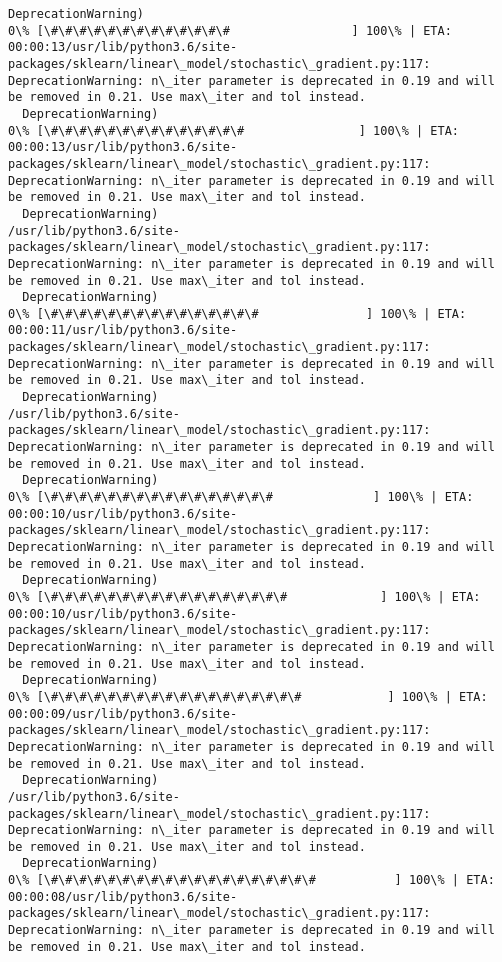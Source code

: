 \documentclass[11pt]{article}
\begin{document}
\begin{Verbatim}[commandchars=\\\{\}]
  DeprecationWarning)
0\% [\#\#\#\#\#\#\#\#\#\#\#\#\#                 ] 100\% | ETA: 00:00:13/usr/lib/python3.6/site-packages/sklearn/linear\_model/stochastic\_gradient.py:117: DeprecationWarning: n\_iter parameter is deprecated in 0.19 and will be removed in 0.21. Use max\_iter and tol instead.
  DeprecationWarning)
0\% [\#\#\#\#\#\#\#\#\#\#\#\#\#\#                ] 100\% | ETA: 00:00:13/usr/lib/python3.6/site-packages/sklearn/linear\_model/stochastic\_gradient.py:117: DeprecationWarning: n\_iter parameter is deprecated in 0.19 and will be removed in 0.21. Use max\_iter and tol instead.
  DeprecationWarning)
/usr/lib/python3.6/site-packages/sklearn/linear\_model/stochastic\_gradient.py:117: DeprecationWarning: n\_iter parameter is deprecated in 0.19 and will be removed in 0.21. Use max\_iter and tol instead.
  DeprecationWarning)
0\% [\#\#\#\#\#\#\#\#\#\#\#\#\#\#\#               ] 100\% | ETA: 00:00:11/usr/lib/python3.6/site-packages/sklearn/linear\_model/stochastic\_gradient.py:117: DeprecationWarning: n\_iter parameter is deprecated in 0.19 and will be removed in 0.21. Use max\_iter and tol instead.
  DeprecationWarning)
/usr/lib/python3.6/site-packages/sklearn/linear\_model/stochastic\_gradient.py:117: DeprecationWarning: n\_iter parameter is deprecated in 0.19 and will be removed in 0.21. Use max\_iter and tol instead.
  DeprecationWarning)
0\% [\#\#\#\#\#\#\#\#\#\#\#\#\#\#\#\#              ] 100\% | ETA: 00:00:10/usr/lib/python3.6/site-packages/sklearn/linear\_model/stochastic\_gradient.py:117: DeprecationWarning: n\_iter parameter is deprecated in 0.19 and will be removed in 0.21. Use max\_iter and tol instead.
  DeprecationWarning)
0\% [\#\#\#\#\#\#\#\#\#\#\#\#\#\#\#\#\#             ] 100\% | ETA: 00:00:10/usr/lib/python3.6/site-packages/sklearn/linear\_model/stochastic\_gradient.py:117: DeprecationWarning: n\_iter parameter is deprecated in 0.19 and will be removed in 0.21. Use max\_iter and tol instead.
  DeprecationWarning)
0\% [\#\#\#\#\#\#\#\#\#\#\#\#\#\#\#\#\#\#            ] 100\% | ETA: 00:00:09/usr/lib/python3.6/site-packages/sklearn/linear\_model/stochastic\_gradient.py:117: DeprecationWarning: n\_iter parameter is deprecated in 0.19 and will be removed in 0.21. Use max\_iter and tol instead.
  DeprecationWarning)
/usr/lib/python3.6/site-packages/sklearn/linear\_model/stochastic\_gradient.py:117: DeprecationWarning: n\_iter parameter is deprecated in 0.19 and will be removed in 0.21. Use max\_iter and tol instead.
  DeprecationWarning)
0\% [\#\#\#\#\#\#\#\#\#\#\#\#\#\#\#\#\#\#\#           ] 100\% | ETA: 00:00:08/usr/lib/python3.6/site-packages/sklearn/linear\_model/stochastic\_gradient.py:117: DeprecationWarning: n\_iter parameter is deprecated in 0.19 and will be removed in 0.21. Use max\_iter and tol instead.

\end{Verbatim}
\end{document}
